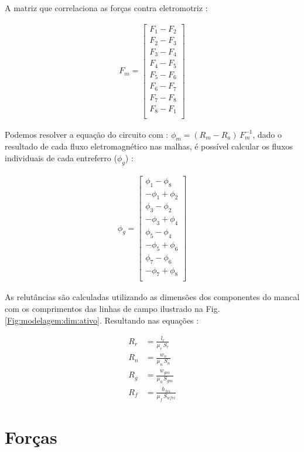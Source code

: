 A matriz que correlaciona as forças contra eletromotriz :

\begin{align}
F_m = 
\begin{bmatrix}
	F_1 - F_2 \\
	F_2 - F_3 \\
	F_3 - F_4 \\
	F_4 - F_5 \\
	F_5 - F_6 \\
	F_6 - F_7 \\
	F_7 - F_8 \\
	F_8 - F_1 \\
\end{bmatrix}
\end{align}

Podemos resolver a equação do circuito com : $ \phi_m = (R_m - R_a) \, F_m^{-1}$, dado o resultado de cada fluxo eletromagnético nas malhas, é possível calcular os fluxos individuais de cada entreferro ($\phi_g$) :

\begin{align}
	\phi_g = 
	\begin{bmatrix}
		 \phi_1 - \phi_8 \\
		-\phi_1 + \phi_2 \\ 
		\phi_3 - \phi_2 \\ 
		-\phi_3 + \phi_4 \\ 
		\phi_5 - \phi_4 \\ 
		-\phi_5 + \phi_6 \\ 
		\phi_7- \phi_6  \\
		-\phi_7+ \phi_8 \\
	\end{bmatrix}
\end{align}

As relutâncias são calculadas utilizando as dimensões dos componentes do mancal com os comprimentos das linhas de campo ilustrado na Fig. \ref{Fig:modelagem:dim:ativo}. Resultando nas equações :

\begin{align}
R_{r}  &= \frac{l_r}{\mu_r \, S_r}			\\
R_{n} &= \frac{w_{n}}{\mu_{n}\, S_{n}}  \\     
R_{g} &= \frac{w_{gni}}{\mu_{0}\, S_{gni}}   \\    
R_{f} &= \frac{h_{fei}}{\mu_{f} \, S_{wfei}}    
\end{align}

\section{Forças}

